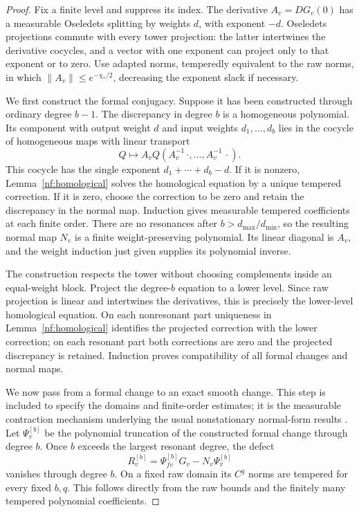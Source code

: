 \begin{proof}
Fix a finite level and suppress its index.  The derivative
$A_v=DG_v(0)$ has a measurable Oseledets splitting by weights $d$,
with exponent $-d$.  Oseledets projections commute with every tower
projection: the latter intertwines the derivative cocycles, and a
vector with one exponent can project only to that exponent or to
zero.  Use adapted norms, temperedly equivalent to the raw norms,
in which $\|A_v\|\leq e^{-\chi_*/2}$, decreasing the exponent
slack if necessary.

We first construct the formal conjugacy.  Suppose it has been
constructed through ordinary degree $b-1$.  The discrepancy in
degree $b$ is a homogeneous polynomial.  Its component with output
weight $d$ and input weights $d_1,\ldots,d_b$ lies in the cocycle
of homogeneous maps with linear transport
\[
 Q\longmapsto A_v Q(A_v^{-1}\,\cdot,\ldots,A_v^{-1}\,\cdot).
\]
This cocycle has the single exponent
$d_1+\cdots+d_b-d$.  If it is nonzero, Lemma~\ref{nf:homological}
solves the homological equation by a unique tempered correction.
If it is zero, choose the correction to be zero and retain the
discrepancy in the normal map.  Induction gives measurable tempered
coefficients at each finite order.  There are no resonances after
$b>d_{\max}/d_{\min}$, so the resulting normal map $N_v$ is a
finite weight-preserving polynomial.  Its linear diagonal is $A_v$,
and the weight induction just given supplies its polynomial inverse.

The construction respects the tower without choosing complements
inside an equal-weight block.  Project the degree-$b$ equation to
a lower level.  Since raw projection is linear and intertwines the
derivatives, this is precisely the lower-level homological equation.
On each nonresonant part uniqueness in
Lemma~\ref{nf:homological} identifies the projected correction with
the lower correction; on each resonant part both corrections are
zero and the projected discrepancy is retained.  Induction proves
compatibility of all formal changes and normal maps.

We now pass from a formal change to an exact smooth change.  This
step is included to specify the domains and finite-order estimates;
it is the measurable contraction mechanism underlying the usual
nonstationary normal-form results
\citep{Melnick2019,KalininSadovskaya2017}.
Let $\Psi_v^{[b]}$ be the polynomial truncation of the constructed
formal change through degree $b$.  Once $b$ exceeds the largest
resonant degree, the defect
\begin{equation}\label{nf:flat-defect}
 R_v^{[b]}=\Psi_{fv}^{[b]}G_v-N_v\Psi_v^{[b]}
\end{equation}
vanishes through degree $b$.  On a fixed raw domain its $C^q$ norms
are tempered for every fixed $b,q$.  This follows directly from the
raw bounds and the finitely many tempered polynomial coefficients.


\end{proof}
